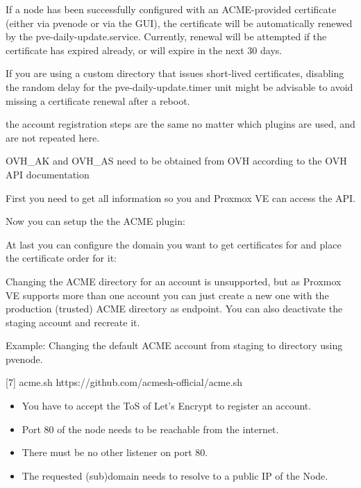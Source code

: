 If a node has been successfully configured with an ACME-provided certificate (either via pvenode or via the GUI), the certificate will be automatically renewed by the pve-daily-update.service. Currently, renewal will be attempted if the certificate has expired already, or will expire in the next 30 days.

If you are using a custom directory that issues short-lived certificates, disabling the random delay for the pve-daily-update.timer unit might be advisable to avoid missing a certificate renewal after a reboot.

the account registration steps are the same no matter which plugins are used, and are not repeated here.

OVH_AK and OVH_AS need to be obtained from OVH according to the OVH API documentation

First you need to get all information so you and Proxmox VE can access the API.

Now you can setup the the ACME plugin:

At last you can configure the domain you want to get certificates for and place the certificate order for it:

Changing the ACME directory for an account is unsupported, but as Proxmox VE supports more than one account you can just create a new one with the production (trusted) ACME directory as endpoint. You can also deactivate the staging account and recreate it.

Example: Changing the default ACME account from staging to directory using pvenode.

[7] acme.sh https://github.com/acmesh-official/acme.sh

\begin{itemize}[leftmargin=2cm]

	\item You have to accept the ToS of Let’s Encrypt to register an account.

	\item Port 80 of the node needs to be reachable from the internet.

	\item There must be no other listener on port 80.

	\item The requested (sub)domain needs to resolve to a public IP of the Node.

\end{itemize}

